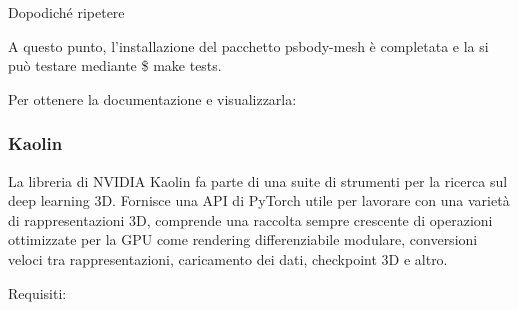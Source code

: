 



Dopodiché ripetere

\medskip






\medskip

A questo punto, l’installazione del pacchetto psbody-mesh è completata e la si può testare mediante \$ make tests.

\medskip

Per ottenere la documentazione e visualizzarla:





\medskip

\subsubsection{Kaolin}

La libreria di NVIDIA Kaolin fa parte di una suite di strumenti per la ricerca sul deep learning 3D. Fornisce una API di PyTorch utile per lavorare con una varietà di rappresentazioni 3D, comprende una raccolta sempre crescente di operazioni ottimizzate per la GPU come rendering differenziabile modulare, conversioni veloci tra rappresentazioni, caricamento dei dati, checkpoint 3D e altro.


\medskip

Requisiti:


